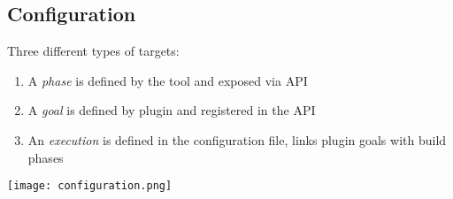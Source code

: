 \documentclass[11pt]{article}
\begin{document}
\subsection{Configuration}
Three different types of targets:
\begin{enumerate}
\item A \textit{phase} is defined by the tool and exposed via API
\item A \textit{goal} is defined by plugin and registered in the API
\item An \textit{execution} is defined in the configuration file, links plugin goals with build phases
\end{enumerate}

\texttt{[image: configuration.png]}
\end{document}
